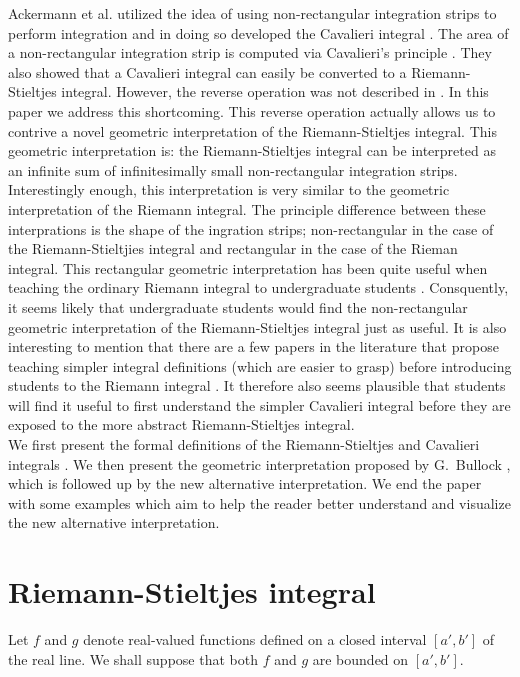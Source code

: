 \documentclass{article}
\theoremstyle{theorem}
\theoremstyle{definition}
\begin{document}
\noindent
Ackermann et al. utilized the idea of using non-rectangular integration strips to perform integration
and in doing so developed the Cavalieri integral \cite{ackermann2012}. The area of a non-rectangular integration strip is computed via 
Cavalieri's principle \cite{andersen1985,eves1991, malik1984, wildberger2002, young1985}. They also showed that a Cavalieri integral can easily be converted to a Riemann-Stieltjes integral. 
However, the reverse operation was not described in \cite{ackermann2012}. In this paper we address this shortcoming. This 
reverse operation actually allows us to contrive a novel geometric interpretation of the Riemann-Stieltjes integral.
This geometric interpretation is: the Riemann-Stieltjes integral can be interpreted as an infinite sum of infinitesimally small
non-rectangular integration strips. Interestingly enough, this interpretation is very similar 
to the geometric interpretation of the Riemann integral. The principle difference between these interprations is the shape of the ingration strips; non-rectangular in the case of the Riemann-Stieltjies integral and rectangular in the case of the Rieman integral.  
This rectangular geometric interpretation has been quite useful when 
teaching the ordinary Riemann integral to undergraduate students \cite{jones2015,sealey2014}. Consquently, it seems likely that undergraduate students would find the non-rectangular geometric interpretation
of the Riemann-Stieltjes integral just as useful. It is also interesting to mention that there are a few papers in the literature that propose teaching simpler integral definitions (which are easier to grasp) before introducing students to the Riemann integral \cite{czarnocha2001,prabhu2008,ruffa2002,zaskis2014}. It therefore also seems plausible that
students will find it useful to first understand the simpler Cavalieri integral before they are exposed to the more abstract Riemann-Stieltjes integral.\\

\noindent
We first present the formal definitions of the Riemann-Stieltjes and Cavalieri integrals \cite{bartle1976,ackermann2012}.
We then present the geometric interpretation proposed by G.~Bullock \cite{bullock1988}, which is followed up by the new alternative interpretation. We end 
the paper with some examples which aim to help the reader better understand and visualize the new alternative interpretation.

\section{Riemann-Stieltjes integral}
Let $f$ and $g$ denote real-valued functions defined on a closed interval $[a',b']$ of the real line. We shall suppose that 
both $f$ and $g$ are bounded on $[a',b']$. 
\end{document}
